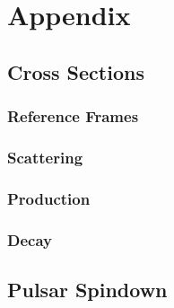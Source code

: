 \chapter*{Appendix}
\label{ch:appendix}

\section{Cross Sections}

\subsection*{Reference Frames}

\subsection*{Scattering}

\subsection*{Production}

\subsection*{Decay}

\section{Pulsar Spindown}

